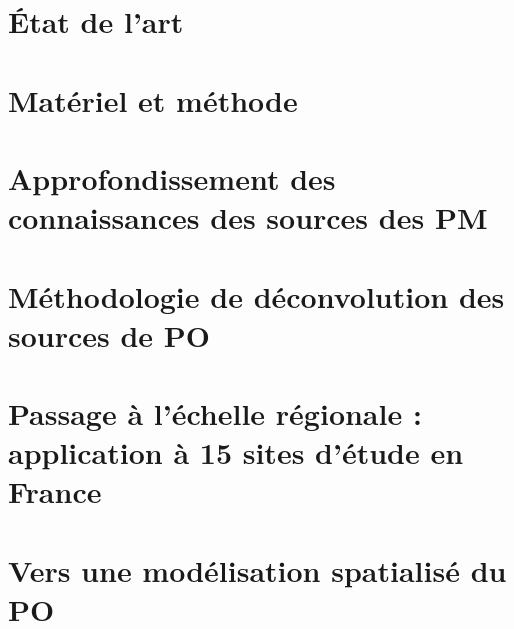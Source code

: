 \documentclass[a4paper,12pt]{book}
\begin{document}
\chapter{État de l'art}
\label{cha:etat_de_lart}
\PartialToc
\clearpage


\chapter{Matériel et méthode}
\label{cha:materiel_et_methode}
\PartialToc
\clearpage


\chapter{Approfondissement des connaissances des sources des PM}%
\label{cha:approfondissement_des_connaissances_des_sources_des_pm}
\PartialToc
\clearpage


\chapter{Méthodologie de déconvolution des sources de PO}
\label{cha:methodology_for_the_attribution_of_intrisinc_op_to_a_pm_source}
\PartialToc
\clearpage


\chapter{Passage à l'échelle régionale : application à 15 sites d'étude en France}
\label{cha:application_to_15_sites_in_France}
\PartialToc
\clearpage
% 

\chapter{Vers une modélisation spatialisé du PO}
\label{cha:spatio_temporal_modelizing}
\PartialToc
\clearpage
% 

\printbibliography


\appendix
\setcounter{table}{0}
\setcounter{figure}{0}
\setcounter{equation}{0}
\renewcommand{\thetable}{\thesection-\arabic{table}}
\renewcommand{\thefigure}{\thesection-\arabic{figure}}
\renewcommand{\theequation}{\thesection-\arabic{equation}}
\end{document}
